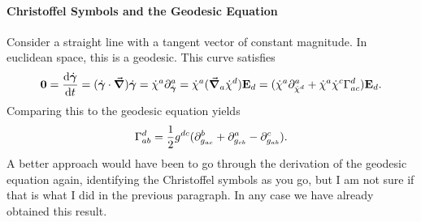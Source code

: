 \paragraph{Christoffel Symbols and the Geodesic Equation}
Consider a straight line with a tangent vector of constant magnitude. In euclidean space, this is a geodesic. This curve satisfies
\begin{align*}
	\vb{0} = \dv{\dot{\vb*{\gamma}}}{t} = (\dot{\vb*{\gamma}}\cdot\grad)\dot{\vb*{\gamma}} = \dot{\chi}^{a}\del{a}{\dot{\vb*{\gamma}}} = \dot{\chi}^{a}(\dcov{a}{\dot{\chi}^{d}})\tb{d} = (\dot{\chi}^{a}\del{a}{\dot{\chi}^{d}} + \dot{\chi}^{a}\dot{\chi}^{c}\chris{d}{a}{c})\tb{d}.
\end{align*}
Comparing this to the geodesic equation yields
\begin{align*}
	\chris{d}{a}{b} = \frac{1}{2}g^{dc}(\del{b}{g_{ac}} + \del{a}{g_{cb}} - \del{c}{g_{ab}}).
\end{align*}
A better approach would have been to go through the derivation of the geodesic equation again, identifying the Christoffel symbols as you go, but I am not sure if that is what I did in the previous paragraph. In any case we have already obtained this result.